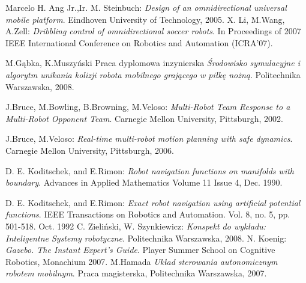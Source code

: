 \begin{thebibliography}{9}
	Marcelo H. Ang Jr.,Ir. M. Steinbuch:
	\emph{Design of an omnidirectional universal mobile platform}.
	  Eindhoven University of Technology, 2005.	  
	X. Li, M.Wang, A.Zell:
	\emph{ Dribbling control of omnidirectional soccer robots}.
	In Proceedings of 2007 IEEE International Conference on Robotics and Automation (ICRA'07).

	M.Gąbka, K.Muszyński
	Praca dyplomowa inzynierska
	\emph{Środowisko symulacyjne i algorytm unikania kolizji robota mobilnego
	grającego w piłkę nożną}.
	Politechnika Warszawska, 2008.

	J.Bruce, M.Bowling, B.Browning, M.Veloso:
	\emph{Multi-Robot Team Response to a Multi-Robot Opponent Team}.
	Carnegie Mellon University, Pittsburgh, 2002.

	J.Bruce, M.Veloso:
	\emph{Real-time multi-robot motion planning with safe dynamics}.
	Carnegie Mellon University, Pittsburgh, 2006.

	D. E. Koditschek, and E.Rimon:
	\emph{Robot navigation functions on manifolds with boundary}.
	Advances in Applied Mathematics
	Volume 11 Issue 4, Dec. 1990.

	D. E. Koditschek, and E.Rimon:
	\emph{Exact robot navigation using artificial potential functions}.
	IEEE Transactions on Robotics and Automation.
	Vol. 8, no. 5, pp. 501-518. Oct. 1992
	C. Zieliński, W. Szynkiewicz:
	\emph{Konspekt do wykładu: Inteligentne Systemy robotyczne}.
	Politechnika Warszawska, 2008.
	N. Koenig:
	\emph{Gazebo. The Instant Expert's Guide}.
	Player Summer School on Cognitive Robotics, Monachium 2007.
 M.Hamada
 \emph{Układ sterowania autonomicznym robotem mobilnym}. Praca magisterska, Politechnika Warszawska, 2007.
\end{thebibliography}
